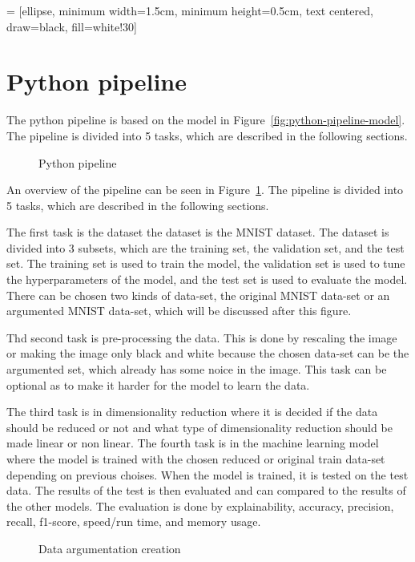  = [ellipse, minimum width=1.5cm, minimum height=0.5cm, text centered, draw=black, fill=white!30]
\section{Python pipeline}\label{sec:python-pipeline}
The python pipeline is based on the model in Figure~\ref{fig:python-pipeline-model}. The pipeline is divided into 5 tasks, which are described in the following sections. 

\begin{figure}[htb!]
    \centering
    
    \caption{Python pipeline}
    \label{fig:Python-pipeline}
\end{figure}

An overview of the pipeline can be seen in Figure~\ref{fig:Python-pipeline}. The pipeline is divided into 5 tasks, which are described in the following sections. 

The first task is the dataset the dataset is the MNIST dataset. The dataset is divided into 3 subsets, which are the training set, the validation set, and the test set. The training set is used to train the model, the validation set is used to tune the hyperparameters of the model, and the test set is used to evaluate the model. There can be chosen two kinds of data-set, the original MNIST data-set or an argumented MNIST data-set, which will be discussed after this figure. 

Thd second task is pre-processing the data. This is done by rescaling the image or making the image only black and white because the chosen data-set can be the argumented set, which already has some noice in the image. This task can be optional as to make it harder for the model to learn the data.

The third task is in dimensionality reduction where it is decided if the data should be reduced or not and what type of dimensionality reduction should be made linear or non linear. The fourth task is in the machine learning model where the model is trained with the chosen reduced or original train data-set depending on previous choises. When the model is trained, it is tested on the test data. The results of the test is then evaluated and can compared to the results of the other models. The evaluation is done by explainability, accuracy, precision, recall, f1-score, speed/run time, and memory usage.

\begin{figure}[htb!]
    \centering
    
    \caption{Data argumentation creation}
    \label{fig:data-argumentation-create}
\end{figure}

